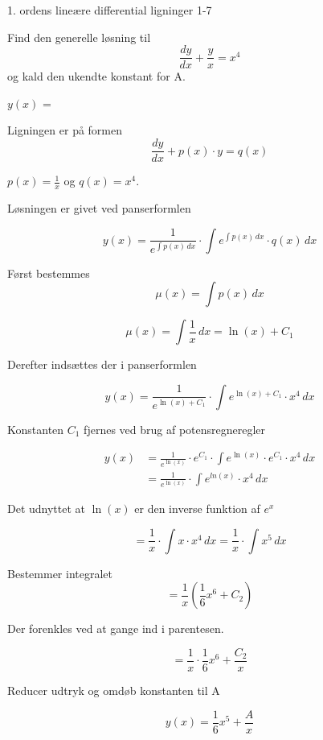 \documentclass{article}
\begin{document}
\newpage

\begin{exercise}{1. ordens lineære differential ligninger 1-7}
	
	
	Find den generelle løsning til
	\[
	\frac{dy}{dx} +  \frac{y}{x} = x^4
	\]
	og kald den ukendte konstant for A.
	
	$y(x)$ =   \\
	
	
	
	\hint
	
	Ligningen er på formen
	\[
	\frac{dy}{dx} + p(x) \cdot y = q(x)
	\]
	
	\hint
	
	$p(x)=\frac{1}{x}$ og $q(x)=x^4$.
	
	\hint
	
	Løsningen er givet ved panserformlen
	
	
	\hint
	
	\[
	y(x) = \frac{1}{e^{\int p(x) \, dx}} \cdot \int e^{\int p(x) \, dx}  \cdot q(x) \, dx
	\]
	
	\hint
	
	Først bestemmes 
	\[
	\mu(x) = \int p(x) \, dx
	\]
	
	\hint
	\[
	\mu(x) = \int \frac{1}{x} \, dx = \ln(x)+ C_1
	\]
	
	\hint
	Derefter indsættes der i  panserformlen
	
	\hint
	
	\[
	y(x) = \frac{1}{e^{\ln(x) + C_1}} \cdot \int e^{\ln(x) + C_1}  \cdot x^4 \, dx
	\]
	
	
	\hint
	
	Konstanten $C_1$ fjernes ved brug af potensregneregler
	
	\hint
	\begin{align*}
	y(x) &= \frac{1}{e^{\ln(x)}} \cdot e^{C_1} \cdot \int e^{\ln(x)} \cdot e^{C_1}  \cdot x^4 \, dx  \\
	&= \frac{1}{e^{\ln(x)}} \cdot \int e^{ln(x)}  \cdot x^4 \, dx
	\end{align*}
	
	\hint
	
	Det udnyttet at $\ln(x)$ er den inverse funktion af $e^x$
	
	
	\hint
	\[
	= \frac{1}{x} \cdot \int x  \cdot x^4 \, dx =  \frac{1}{x} \cdot \int  x^5 \, dx
	\]
	
	\hint
	
	Bestemmer integralet
	\[
	= \frac{1}{x} \left( \frac{1}{6}x^6 + C_2    \right)
	\]
	
	\hint
	
	Der forenkles ved at gange ind i parentesen.
	
	\hint
	\[
	= \frac{1}{x} \cdot \frac{1}{6}x^6 + \frac{C_2}{x} 
	\]
	
	\hint
	
	Reducer udtryk og omdøb konstanten til A
	
	\hint
	\[
	y(x) =  \frac{1}{6}x^5 + \frac{A}{x}
	\]
	
	
\end{exercise}
\end{document}
